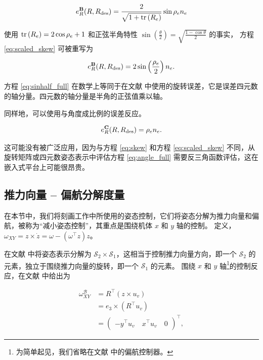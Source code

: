\documentclass[conference]{IEEEtran}
\begin{document}
\begin{align}
  \label{eq:scaled_skew}
  e_R^{\textbf{B}}(R, \Rdes) = \frac{2}{\sqrt{1 + \tr\left(R_e\right)}}\sin\rho_e n_e
\end{align}

使用 $\operatorname{tr}\left(R_e\right) = 2\cos\rho_e + 1$ \citep{mueller_multicopter_2018} 和正弦半角特性 $\sin\left(\frac{\theta}{2}\right) = \sqrt{\frac{1 - \cos\theta}{2}}$ 的事实，
方程 \eqref{eq:scaled_skew} 可被重写为

\begin{align}
  \label{eq:sinhalf_full}
  e_R^{\textbf{B}}(R, \Rdes) = 2\sin\left(\frac{\rho_e}{2}\right) n_e.
\end{align}

方程 \eqref{eq:sinhalf_full} 在数学上等同于在文献 \citet{fresk_full_2013} 中使用的旋转误差，它是误差四元数的轴分量。四元数的轴分量是半角的正弦值乘以轴。

同样地，可以使用与角度成比例的误差反应。

\begin{align}
  \label{eq:angle_full}
  e_R^{\textbf{C}}(R, \Rdes) = \rho_e n_e.
\end{align}

这可能没有被广泛应用，因为与方程 \eqref{eq:skew} 和方程 \eqref{eq:scaled_skew} 不同，从旋转矩阵或四元数姿态表示中评估方程 \eqref{eq:angle_full} 需要反三角函数评估，这在嵌入式平台上可能很昂贵。

\subsection{推力向量 -- 偏航分解度量}

在本节中，我们将刻画工作中所使用的姿态控制，它们将姿态分解为推力向量和偏航，被称为``减小姿态控制''，其重点是围绕机体 $x$ 和 $y$ 轴的控制。
定义，$\omega_{XY} = z \times \dot z = \omega - \left(\omega^\top z\right) z$。

在文献 \citet{kooijman_trajectory_2019} 中将姿态表示分解为 $\mathcal S_2 \times \mathcal S_1$，这相当于控制推力向量方向，即一个 $\mathcal S_2$ 的元素，独立于围绕推力向量的旋转，即一个 $\mathcal S_1$ 的元素。
围绕 $x$ 和 $y$ 轴\footnote{为简单起见，我们省略在文献 \citet{kooijman_trajectory_2019} 中的偏航控制器。}的控制反应，在文献 \citet{kooijman_trajectory_2019} 中给出为 

\begin{align}
  \label{eq:s2s1_omxy}
  \omega_{XY}^{\mathcal B} &= R^\top ( z \times u_v ) \\
              &= e_3 \times (R^\top u_v) \\
              &= \begin{pmatrix} -y^\top u_v \quad x^\top u_v \quad 0 \end{pmatrix}^\top,
\end{align}
\end{document}

